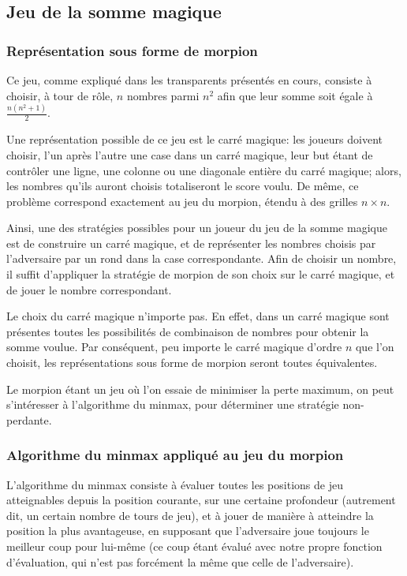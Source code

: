 \subsection{Jeu de la somme magique}

\subsubsection{Représentation sous forme de morpion}
Ce jeu, comme expliqué dans les transparents présentés en cours,
consiste à choisir, à tour de rôle, $n$ nombres parmi $n^2$ afin que
leur somme soit égale à $\frac{n(n^2+1)}{2}$.

Une représentation possible de ce jeu est le carré magique: les
joueurs doivent choisir, l'un après l'autre une case dans un carré
magique, leur but étant de contrôler une ligne, une colonne ou une
diagonale entière du carré magique; alors, les nombres qu'ils auront
choisis totaliseront le score voulu. De même, ce problème correspond exactement
au jeu du morpion, étendu à des grilles $n \times n$.

Ainsi, une des stratégies possibles pour un joueur du jeu de la somme
magique est de construire un carré magique, et de représenter les
nombres choisis par l'adversaire par un rond dans la case
correspondante. Afin de choisir un nombre, il suffit d'appliquer la
stratégie de morpion de son choix sur le carré magique, et de
jouer le nombre correspondant.

Le choix du carré magique n'importe pas. En effet, dans un carré
magique sont présentes toutes les possibilités de combinaison de
nombres pour obtenir la somme voulue. Par conséquent, peu importe le
carré magique d'ordre $n$ que l'on choisit, les représentations sous forme de
morpion seront toutes équivalentes.

Le morpion étant un jeu où l'on essaie de minimiser la perte maximum,
on peut s'intéresser à l'algorithme du minmax, pour déterminer une
stratégie non-perdante.

\subsubsection{Algorithme du minmax appliqué au jeu du morpion}
L'algorithme du minmax consiste à évaluer toutes les positions de jeu
atteignables depuis la position courante, sur une certaine profondeur
(autrement dit, un certain nombre de tours de jeu), et à jouer de
manière à atteindre la position la plus avantageuse, en supposant que
l'adversaire joue toujours le meilleur coup pour lui-même (ce coup
étant évalué avec notre propre fonction d'évaluation, qui n'est pas
forcément la même que celle de l'adversaire).

